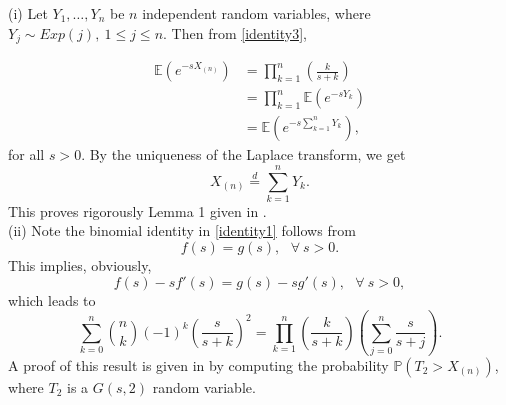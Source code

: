 \documentclass[11pt]{amsart}
\numberwithin{equation}{section}
\begin{document}
(i) Let $Y_{1},\ldots, Y_{n}$ be $n$ independent random variables, where $Y_{j}\sim Exp(j),~1\leq j\leq n.$ Then from \eqref{identity3},

\begin{align*}
 \mathbb{E}(e^{-sX_{(n)}})&=\prod_{k=1}^{n}\left(\frac{k}{s+k}\right)\nonumber \\
 &=\prod_{k=1}^{n}\mathbb{E}(e^{-sY_{k}})\nonumber \\
 &=\mathbb{E}(e^{-s\sum_{k=1}^{n}Y_{k}}),
\end{align*}
for all $s>0$. By the uniqueness of the Laplace transform, we get
\begin{equation*}
 X_{(n)}\stackrel{d}{=}\sum_{k=1}^{n}Y_{k}.
\end{equation*}
This proves rigorously Lemma 1 given in \cite{peter}.\\

(ii) Note the binomial identity in \eqref{identity1} follows from 
\begin{equation*}
 f(s)=g(s),~~~\forall~ s>0.
\end{equation*}
This implies, obviously,
\begin{equation}\label{diffidentity}
 f(s)-sf'(s)=g(s)-sg'(s),~~~\forall~ s>0,
\end{equation}
which leads to 
\begin{equation}\label{diffidentity2}
 \sum_{k=0}^{n}\binom{n}{k}(-1)^{k}\left(\frac{s}{s+k}\right)^{2}=\prod_{k=1}^{n}\left(\frac{k}{s+k}\right)\left(\sum_{j=0}^{n}\frac{s}{s+j}\right).
\end{equation}
A proof of this result is given in \cite{peter} by computing the probability $\mathbb{P}(T_{2}>X_{(n)})$, where $T_{2}$ is a $G(s,2)$ random variable.\\
\end{document}
